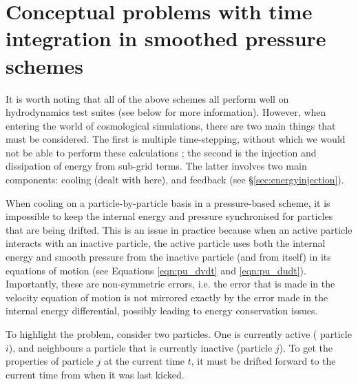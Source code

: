 \section{Conceptual problems with time integration in smoothed pressure schemes}
\label{sec:timeintegration}

It is worth noting that all of the above schemes all perform well on
hydrodynamics test suites (see below for more information). However,
when entering the world of cosmological simulations, there are two main things
that must be considered. The first is multiple time-stepping, without
which we would not be able to perform these calculations \citep[see ][]{Borrow2018};
the second is the injection and dissipation of energy from sub-grid
terms. The latter involves two main components: cooling (dealt with here),
and feedback (see \S \ref{sec:energyinjection}).

When cooling on a particle-by-particle basis in a pressure-based scheme, it
is impossible to keep the internal energy and pressure synchronised for
particles that are being drifted. This is an issue in practice because when
an active particle interacts with an inactive particle, the active particle
uses both the internal energy and smooth pressure from the inactive particle
(and from itself) in its equations of motion (see Equations \ref{eqn:pu_dvdt}
and \ref{eqn:pu_dudt}). Importantly, these are non-symmetric errors, i.e. the
error that is made in the velocity equation of motion is not mirrored exactly
by the error made in the internal energy differential, possibly leading to
energy conservation issues.

To highlight the problem, consider two particles. One is currently active (
particle $i$), and neighbours a particle that is currently inactive
(particle $j$). To get the properties of particle $j$ at the current time $t$,
it must be drifted forward to the current time from when it was last kicked.

